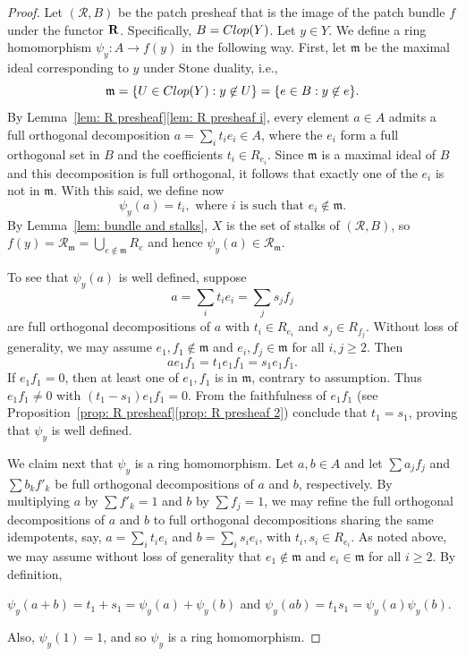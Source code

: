 \documentclass[10pt,a4paper]{amsart}
\def\cal{\mathcal}
\def\m{{\mathfrak m}} %
\begin{document}
\begin{proof}
Let $({\cal R},B)$ be the patch presheaf that is the image of the patch bundle $f$ under the functor ${\bf R}$. Specifically, $B = {\rm Clop}(Y)$. Let ${y} \in Y$. 
We define a ring homomorphism $\psi_{y}:A \rightarrow f(y)$  in the following way. First, let $\m$ be the maximal ideal corresponding to $y$ under Stone duality, i.e., $$\m = \{U \in {\rm Clop}(Y):y \not\in U\}=\{e\in B : y\not \in e\}.$$ By Lemma~\ref{lem: R presheaf}\ref{lem: R presheaf i}, every element $a\in A$ admits a full orthogonal decomposition $a=\sum_i t_ie_i \in A$, where the $e_i$ form a full orthogonal set in $B$ and the coefficients $t_i \in R_{e_i}$. Since $\m$ is a maximal ideal of $B$ and this decomposition is full orthogonal, it follows that exactly one of the $e_i$ is not in $\m$. 
With this said, we define now 
\[\psi_{y}(a) = t_i,\text{ where }i\text{ is such that }e_i \not \in \m.\] By Lemma~\ref{lem: bundle and stalks}, $X$ is the set of stalks of $({\cal R},B)$, so 
$ f (y)={\mathcal{R}}_\m=\bigcup_{e\not \in \m} R_e$ and hence  $\psi_{y}(a) \in {\mathcal{R}}_{\m}$. 

To see that $\psi_y(a)$ is well defined, suppose $$a = \sum_i t_i e_i = \sum_j s_j f_j$$ are full orthogonal decompositions of $a$ with $t_i \in R_{e_i}$ and $s_j \in R_{f_j}$.  Without loss of generality, we may assume $e_1,f_1 \not \in \m$ and $e_i,f_j \in \m$ for all $i,j \geq 2$.   Then $$ae_1f_1 =t_1e_1f_1=s_1e_1f_1.$$  
If $e_1f_1 =0$, then at least one of $e_1,f_1$ is in $\m$, contrary to assumption. Thus $e_1f_1 \ne 0$ with $(t_1 -s_1)e_1f_1=0$. From the faithfulness of $e_1f_1$ (see Proposition~\ref{prop: R presheaf}\ref{prop: R presheaf 2}) conclude that $t_1 = s_1$, proving that $\psi_y$ is well defined. 

We claim next that $\psi_{y}$ is a ring homomorphism. 
Let $a,b \in A$ and let $\sum a_j f_j$ and $\sum b_k f'_k$ be full orthogonal decompositions of $a$ and $b$, respectively. By multiplying $a$ by $\sum f'_k=1$ and $b$ by $\sum f_j=1$, we may refine the full orthogonal decompositions of $a$ and $b$ to full orthogonal decompositions sharing the same idempotents, say,  $a =\sum_i t_i e_i$ and $b = \sum_i s_ie_i$, with $t_i,s_i \in R_{e_i}$. As noted above, we may assume without loss of generality that $e_1\not \in \m$ and $e_i \in \m$ for all $i \geq 2$.  By definition, \begin{center} $\psi_y(a+b) = t_1+s_1 = \psi_y(a)+\psi_y(b)$ and $\psi_y(ab) = t_1s_1 = \psi_y(a)\psi_y(b)$.
\end{center}
Also, $\psi_y(1) =1$,  and so $\psi_y$ is a ring homomorphism.




\end{proof}
\end{document}
